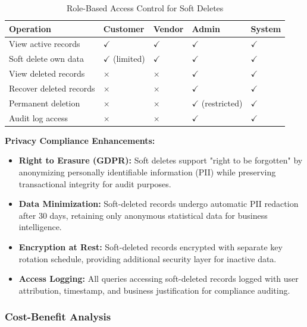\documentclass[12pt,a4paper]{article}
\begin{document}
\begin{table}[H]
\centering
\small
\begin{tabular}{|p{3cm}|p{2.5cm}|p{2.5cm}|p{2.5cm}|p{2.5cm}|}
\hline
\textbf{Operation} & \textbf{Customer} & \textbf{Vendor} & \textbf{Admin} & \textbf{System} \\
\hline
View active records & $\checkmark$ & $\checkmark$ & $\checkmark$ & $\checkmark$ \\
\hline
Soft delete own data & $\checkmark$ (limited) & $\checkmark$ & $\checkmark$ & $\checkmark$ \\
\hline
View deleted records & $\times$ & $\times$ & $\checkmark$ & $\checkmark$ \\
\hline
Recover deleted records & $\times$ & $\times$ & $\checkmark$ & $\checkmark$ \\
\hline
Permanent deletion & $\times$ & $\times$ & $\checkmark$ (restricted) & $\checkmark$ \\
\hline
Audit log access & $\times$ & $\times$ & $\checkmark$ & $\checkmark$ \\
\hline
\end{tabular}
\caption{Role-Based Access Control for Soft Deletes}
\end{table}

\vspace{0.5em}

\textbf{Privacy Compliance Enhancements:}

\begin{itemize}[leftmargin=2em, itemsep=6pt]
    \item \textbf{Right to Erasure (GDPR):} Soft deletes support "right to be forgotten" by anonymizing personally identifiable information (PII) while preserving transactional integrity for audit purposes.
    \item \textbf{Data Minimization:} Soft-deleted records undergo automatic PII redaction after 30 days, retaining only anonymous statistical data for business intelligence.
    \item \textbf{Encryption at Rest:} Soft-deleted records encrypted with separate key rotation schedule, providing additional security layer for inactive data.
    \item \textbf{Access Logging:} All queries accessing soft-deleted records logged with user attribution, timestamp, and business justification for compliance auditing.
\end{itemize}

\subsubsection{Cost-Benefit Analysis}
\end{document}
